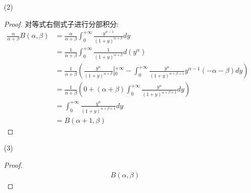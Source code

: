 \documentclass{article}
\begin{document}
\begin{enumerate}
\begin{enumerate}
\begin{proof}[解]
\begin{equation}
\begin{aligned}
                    \lim_{y\rightarrow+\infty}\frac{\frac{y^{\alpha-1}}{(1+y)^{\alpha+\beta}}}{\frac{1}{y^{1+\epsilon}}}
                    &=\lim_{y\rightarrow+\infty}\frac{y^{\alpha+\epsilon}}{(1+y)^{\alpha+\beta}} \\
                    &=\lim_{y\rightarrow+\infty}\frac{y^{\alpha+\epsilon}}{y^{\alpha+\beta}} \\
                    &=\lim_{y\rightarrow+\infty}y^{\epsilon-\beta} \\
                    &=0
                \end{aligned}
                \nonumber
            \end{equation} \par
            解得 $\beta>0$.
        \end{proof}
        \item[(2)] \begin{proof}
            对等式右侧式子进行分部积分:
            \begin{equation}
                \begin{aligned}
                    \frac{\alpha}{\alpha+\beta}B(\alpha,\beta)
                    &=\frac{\alpha}{\alpha+\beta}\int_{0}^{+\infty}\frac{y^{\alpha-1}}{(1+y)^{\alpha+\beta}}dy \\
                    &=\frac{1}{\alpha+\beta}\int_{0}^{+\infty}\frac{1}{(1+y)^{\alpha+\beta}}d(y^{\alpha}) \\
                    &=\frac{1}{\alpha+\beta}\left(\frac{y^{\alpha}}{(1+y)^{\alpha+\beta}}\left|_{0}^{+\infty}\right.-\int_{0}^{+\infty}\frac{y^{\alpha}}{(1+y)^{\alpha+\beta+1}}y^{\alpha-1}(-\alpha-\beta)dy\right) \\
                    &=\frac{1}{\alpha+\beta}\left(0+(\alpha+\beta)\int_{0}^{+\infty}\frac{y^{\alpha}}{(1+y)^{\alpha+\beta+1}}dy\right) \\
                    &=\int_{0}^{+\infty}\frac{y^{\alpha}}{(1+y)^{\alpha+\beta+1}}dy \\
                    &=B(\alpha+1,\beta)
                \end{aligned}
                \nonumber
            \end{equation}
        \end{proof}
        \item[(3)] \begin{proof}
            \begin{equation}
                \begin{aligned}
                    B(\alpha,\beta)

\end{aligned}
\end{equation}
\end{proof}
\end{enumerate}
\end{enumerate}
\end{document}
